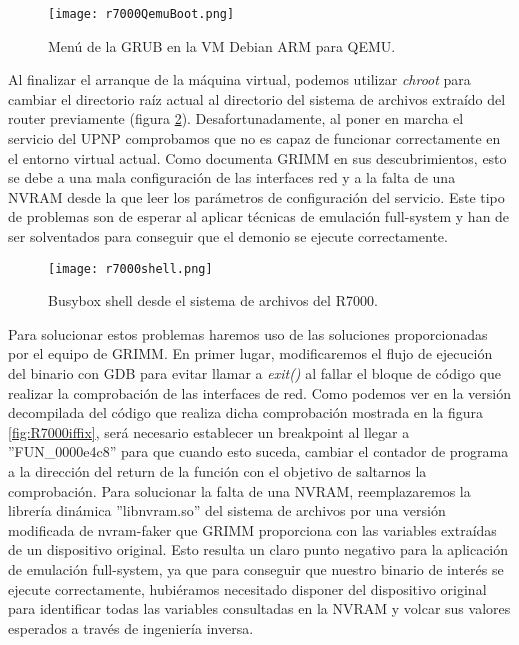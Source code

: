\begin{figure}[H]
    \centering
    \texttt{[image: r7000QemuBoot.png]}
    \caption{Menú de la GRUB en la VM Debian ARM para QEMU.}
    \label{fig:R7000QemuBoot}
\end{figure}

Al finalizar el arranque de la máquina virtual, podemos utilizar \textit{chroot} para cambiar el directorio raíz actual al directorio 
del sistema de archivos extraído del router previamente (figura \ref{fig:R7000shell}). Desafortunadamente, al poner en marcha el 
servicio del UPNP comprobamos que no es capaz de funcionar correctamente en el entorno virtual actual. Como documenta GRIMM\cite{r7000GRIMM}
en sus descubrimientos, esto se debe a una mala configuración de las interfaces red y a la falta de una NVRAM desde la que leer los 
parámetros de configuración del servicio. Este tipo de problemas son de esperar al aplicar técnicas de emulación full-system y han 
de ser solventados para conseguir que el demonio se ejecute correctamente.

\begin{figure}[H]
    \centering
    \texttt{[image: r7000shell.png]}
    \caption{Busybox shell desde el sistema de archivos del R7000.}
    \label{fig:R7000shell}
\end{figure}

Para solucionar estos problemas haremos uso de las soluciones proporcionadas por el equipo de GRIMM\cite{r7000GRIMM}. En primer
lugar, modificaremos el flujo de ejecución del binario con GDB para evitar llamar a \textit{exit()} al fallar el bloque de código 
que realizar la comprobación de las interfaces de red. Como podemos ver en la versión decompilada del código que realiza dicha 
comprobación mostrada en la figura \ref{fig:R7000iffix}, será necesario establecer un breakpoint al llegar a ''FUN\_0000e4c8''
para que cuando esto suceda, cambiar el contador de programa a la dirección del return de la función con el objetivo de saltarnos 
la comprobación. Para solucionar la falta de una NVRAM, reemplazaremos la librería dinámica ''libnvram.so'' del sistema de archivos 
por una versión modificada de nvram-faker\cite{nvram} que GRIMM proporciona con las variables extraídas de un dispositivo original.
Esto resulta un claro punto negativo para la aplicación de emulación full-system, ya que para conseguir que nuestro binario de 
interés se ejecute correctamente, hubiéramos necesitado disponer del dispositivo original para identificar todas las variables 
consultadas en la NVRAM y volcar sus valores esperados a través de ingeniería inversa.

